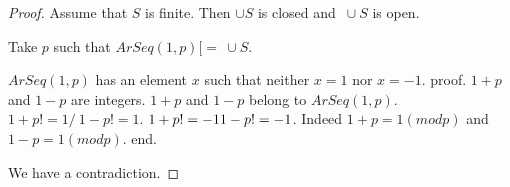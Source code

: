\documentclass{article}
\begin{document}
\begin{forthel}
\begin{proof}
      Assume that $S$ is finite. Then $\cup S$ is closed and $~ \cup S$ is open.

      Take $p$ such that $ArSeq(1,p) [= ~ \cup S$.

      $ArSeq(1,p)$ has an element $x$ such that neither $x = 1$ nor $x = -1$.
      proof.
        $1 + p$ and $1 - p$ are integers.
        $1 + p$ and $1 - p$ belong to $ArSeq(1,p)$. $1 + p !=  1 /\ 1 - p !=  1$. $1 + p != -1 \/ 1 - p != -1$.
        Indeed $1 + p = 1 (mod p)$ and $1 - p = 1 (mod p)$.
      end.

      We have a contradiction.
    \end{proof}
  \end{forthel}
\end{document}

